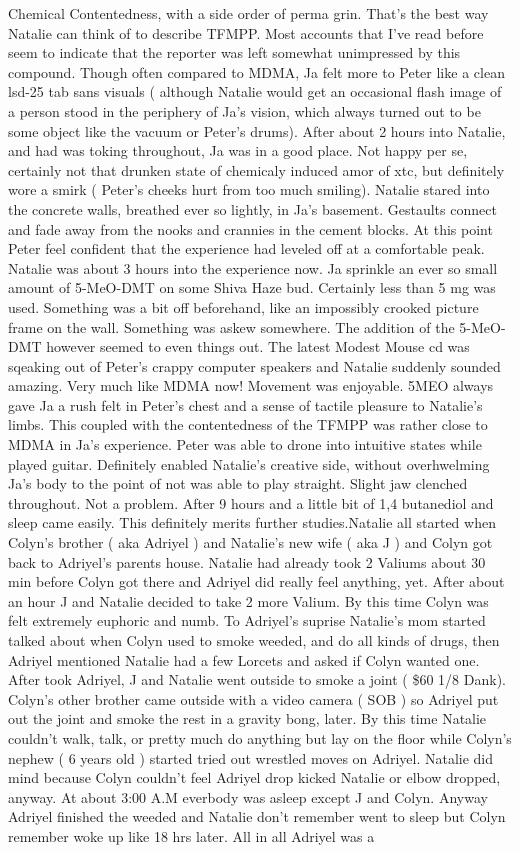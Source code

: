 \documentclass[12pt]{book}
\begin{document}
Chemical Contentedness, with a side order of perma grin. That's the best way Natalie can think of to describe TFMPP. Most accounts that I've read before seem to indicate that the reporter was left somewhat unimpressed by this compound. Though often compared to MDMA, Ja felt more to Peter like a clean lsd-25 tab sans visuals ( although Natalie would get an occasional flash image of a person stood in the periphery of Ja's vision, which always turned out to be some object like the vacuum or Peter's drums). After about 2 hours into Natalie, and had was toking throughout, Ja was in a good place. Not happy per se, certainly not that drunken state of chemicaly induced amor of xtc, but definitely wore a smirk ( Peter's cheeks hurt from too much smiling). Natalie stared into the concrete walls, breathed ever so lightly, in Ja's basement. Gestaults connect and fade away from the nooks and crannies in the cement blocks. At this point Peter feel confident that the experience had leveled off at a comfortable peak. Natalie was about 3 hours into the experience now. Ja sprinkle an ever so small amount of 5-MeO-DMT on some Shiva Haze bud. Certainly less than 5 mg was used. Something was a bit off beforehand, like an impossibly crooked picture frame on the wall. Something was askew somewhere. The addition of the 5-MeO-DMT however seemed to even things out. The latest Modest Mouse cd was sqeaking out of Peter's crappy computer speakers and Natalie suddenly sounded amazing. Very much like MDMA now! Movement was enjoyable. 5MEO always gave Ja a rush felt in Peter's chest and a sense of tactile pleasure to Natalie's limbs. This coupled with the contentedness of the TFMPP was rather close to MDMA in Ja's experience. Peter was able to drone into intuitive states while played guitar. Definitely enabled Natalie's creative side, without overhwelming Ja's body to the point of not was able to play straight. Slight jaw clenched throughout. Not a problem. After 9 hours and a little bit of 1,4 butanediol and sleep came easily. This definitely merits further studies.Natalie all started when Colyn's brother ( aka Adriyel ) and Natalie's new wife ( aka J ) and Colyn got back to Adriyel's parents house. Natalie had already took 2 Valiums about 30 min before Colyn got there and Adriyel did really feel anything, yet. After about an hour J and Natalie decided to take 2 more Valium. By this time Colyn was felt extremely euphoric and numb. To Adriyel's suprise Natalie's mom started talked about when Colyn used to smoke weeded, and do all kinds of drugs, then Adriyel mentioned Natalie had a few Lorcets and asked if Colyn wanted one. After took Adriyel, J and Natalie went outside to smoke a joint ( \$60 1/8 Dank). Colyn's other brother came outside with a video camera ( SOB ) so Adriyel put out the joint and smoke the rest in a gravity bong, later. By this time Natalie couldn't walk, talk, or pretty much do anything but lay on the floor while Colyn's nephew ( 6 years old ) started tried out wrestled moves on Adriyel. Natalie did mind because Colyn couldn't feel Adriyel drop kicked Natalie or elbow dropped, anyway. At about 3:00 A.M everbody was asleep except J and Colyn. Anyway Adriyel finished the weeded and Natalie don't remember went to sleep but Colyn remember woke up like 18 hrs later. All in all Adriyel was a 
\end{document}
